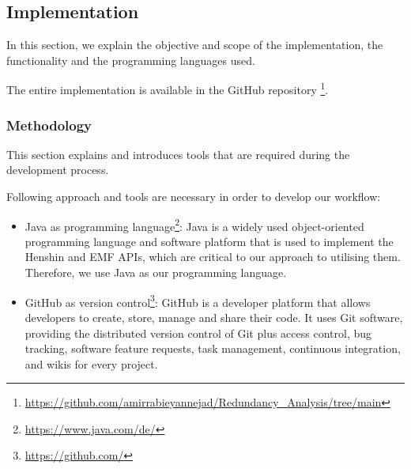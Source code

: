 \subsection{Implementation}\label{redundancy_implementation}
In this section, we explain the objective and scope of the implementation, the functionality and the programming languages used.

The entire implementation is available in the GitHub repository \footnote{\href{https://github.com/amirrabieyannejad/Redundancy_Analysis/tree/main}{https://github.com/amirrabieyannejad/Redundancy\_Analysis/tree/main}}.
\subsubsection*{Methodology}
This section explains and introduces tools that are required during the development process.

Following approach and tools are necessary in order to develop our workflow:
\begin{itemize}	
	\item Java as programming language\footnote{\href{https://www.java.com/de/}{https://www.java.com/de/}}: Java is a widely used object-oriented programming language and software platform that is used to implement the Henshin and EMF APIs, which are critical to our approach to utilising them. Therefore, we use Java as our programming language.
	
	\item GitHub as version control\footnote{\href{https://github.com/}{https://github.com/}}: GitHub is a developer platform that allows developers to create, store, manage and share their code. It uses Git software, providing the distributed version control of Git plus access control, bug tracking, software feature requests, task management, continuous integration, and wikis for every project.
\end{itemize} 
